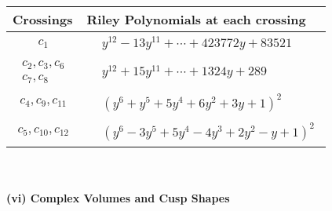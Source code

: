 \documentclass[1p]{elsarticle_modified}
\theoremstyle{definition}
\begin{document}
\begin{tabular}{m{50pt}|m{274pt}}
Crossings & \hspace{64pt}Riley Polynomials at each crossing \\
\hline $$\begin{aligned}c_{1}\end{aligned}$$&$\begin{aligned}
&y^{12}-13 y^{11}+\cdots+423772 y+83521
\end{aligned}$\\
\hline $$\begin{aligned}c_{2},c_{3},c_{6}\\c_{7},c_{8}\end{aligned}$$&$\begin{aligned}
&y^{12}+15 y^{11}+\cdots+1324 y+289
\end{aligned}$\\
\hline $$\begin{aligned}c_{4},c_{9},c_{11}\end{aligned}$$&$\begin{aligned}
&(y^6+y^5+5 y^4+6 y^2+3 y+1)^2
\end{aligned}$\\
\hline $$\begin{aligned}c_{5},c_{10},c_{12}\end{aligned}$$&$\begin{aligned}
&(y^6-3 y^5+5 y^4-4 y^3+2 y^2- y+1)^2
\end{aligned}$\\
\hline
\end{tabular}\\~\\
\newpage\flushleft \textbf{(vi) Complex Volumes and Cusp Shapes}
\end{document}
